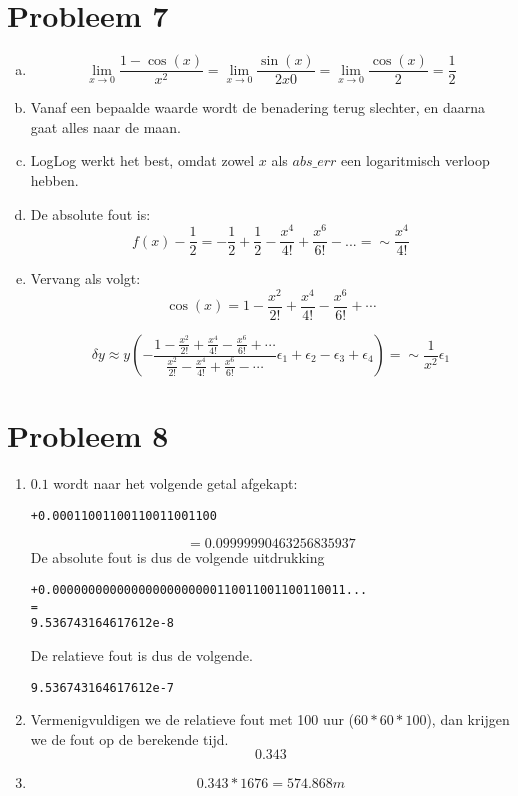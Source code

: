 \documentclass[12pt,a4paper]{article}
\begin{document}
\section{Probleem 7}
\begin{enumerate}[(a)]
\item
\[
\lim_{x \rightarrow 0} \frac{1-\cos(x)}{x^2}
= \lim_{x \rightarrow 0} \frac{\sin(x)}{2x0}
= \lim_{x \rightarrow 0} \frac{\cos(x)}{2}
= \frac{1}{2}
\]

\item
Vanaf een bepaalde waarde wordt de benadering terug slechter, en daarna gaat alles naar de maan.

\item
LogLog werkt het best, omdat zowel $x$ als $abs\_err$ een logaritmisch verloop hebben.

\item
De absolute fout is:
\[
f(x)-\frac{1}{2} = -\frac{1}{2} + \frac{1}{2} - \frac{x^4}{4!} + \frac{x^6}{6!} -... = \sim\frac{x^4}{4!}
\]

\item
Vervang als volgt:
\[
\cos(x) = 1 - \frac{x^2}{2!} + \frac{x^4}{4!} - \frac{x^6}{6!} + \cdots
\]

\[
\delta y \approx y \left( - \frac{1 - \frac{x^2}{2!} + \frac{x^4}{4!} - \frac{x^6}{6!} + \cdots}{\frac{x^2}{2!} - \frac{x^4}{4!} + \frac{x^6}{6!} - \cdots}\epsilon_1 + \epsilon_2 - \epsilon_3 + \epsilon_4 \right)  = \sim \frac{1}{x^2}\epsilon_1
\]

\end{enumerate}

\section{Probleem 8}
\begin{enumerate}
\item $0.1$ wordt naar het volgende getal afgekapt:
{\scriptsize \begin{verbatim}
+0.00011001100110011001100
\end{verbatim}}
\[
= 0.09999990463256835937
\]
De absolute fout is dus de volgende uitdrukking
{\scriptsize \begin{verbatim}
+0.00000000000000000000000110011001100110011...
=
9.536743164617612e-8
\end{verbatim}}
De relatieve fout is dus de volgende.
{\scriptsize \begin{verbatim}
9.536743164617612e-7
\end{verbatim}}

\item Vermenigvuldigen we de relatieve fout met 100 uur ($60*60*100$), dan krijgen we de fout op de berekende tijd.
\[
0.343
\]

\item
\[
0.343 * 1676 = 574.868m
\]
\end{enumerate}
\end{document}
